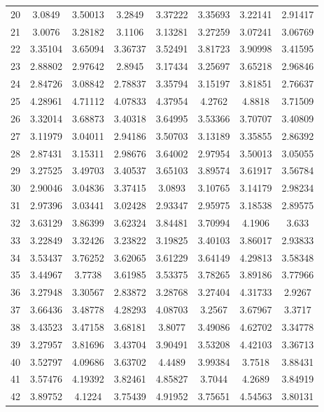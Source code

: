 \begin{center}
\begin{longtable}{cccccccc}
20 & 3.0849 & 3.50013 & 3.2849 & 3.37222 & 3.35693 & 3.22141 & 2.91417\\
21 & 3.0076 & 3.28182 & 3.1106 & 3.13281 & 3.27259 & 3.07241 & 3.06769\\
22 & 3.35104 & 3.65094 & 3.36737 & 3.52491 & 3.81723 & 3.90998 & 3.41595\\
23 & 2.88802 & 2.97642 & 2.8945 & 3.17434 & 3.25697 & 3.65218 & 2.96846\\
24 & 2.84726 & 3.08842 & 2.78837 & 3.35794 & 3.15197 & 3.81851 & 2.76637\\
25 & 4.28961 & 4.71112 & 4.07833 & 4.37954 & 4.2762 & 4.8818 & 3.71509\\
26 & 3.32014 & 3.68873 & 3.40318 & 3.64995 & 3.53366 & 3.70707 & 3.40809\\
27 & 3.11979 & 3.04011 & 2.94186 & 3.50703 & 3.13189 & 3.35855 & 2.86392\\
28 & 2.87431 & 3.15311 & 2.98676 & 3.64002 & 2.97954 & 3.50013 & 3.05055\\
29 & 3.27525 & 3.49703 & 3.40537 & 3.65103 & 3.89574 & 3.61917 & 3.56784\\
30 & 2.90046 & 3.04836 & 3.37415 & 3.0893 & 3.10765 & 3.14179 & 2.98234\\
31 & 2.97396 & 3.03441 & 3.02428 & 2.93347 & 2.95975 & 3.18538 & 2.89575\\
32 & 3.63129 & 3.86399 & 3.62324 & 3.84481 & 3.70994 & 4.1906 & 3.633\\
33 & 3.22849 & 3.32426 & 3.23822 & 3.19825 & 3.40103 & 3.86017 & 2.93833\\
34 & 3.53437 & 3.76252 & 3.62065 & 3.61229 & 3.64149 & 4.29813 & 3.58348\\
35 & 3.44967 & 3.7738 & 3.61985 & 3.53375 & 3.78265 & 3.89186 & 3.77966\\
36 & 3.27948 & 3.30567 & 2.83872 & 3.28768 & 3.27404 & 4.31733 & 2.9267\\
37 & 3.66436 & 3.48778 & 4.28293 & 4.08703 & 3.2567 & 3.67967 & 3.3717\\
38 & 3.43523 & 3.47158 & 3.68181 & 3.8077 & 3.49086 & 4.62702 & 3.34778\\
39 & 3.27957 & 3.81696 & 3.43704 & 3.90491 & 3.53208 & 4.42103 & 3.36713\\
40 & 3.52797 & 4.09686 & 3.63702 & 4.4489 & 3.99384 & 3.7518 & 3.88431\\
41 & 3.57476 & 4.19392 & 3.82461 & 4.85827 & 3.7044 & 4.2689 & 3.84919\\
42 & 3.89752 & 4.1224 & 3.75439 & 4.91952 & 3.75651 & 4.54563 & 3.80131\\

\end{longtable}
\end{center}
